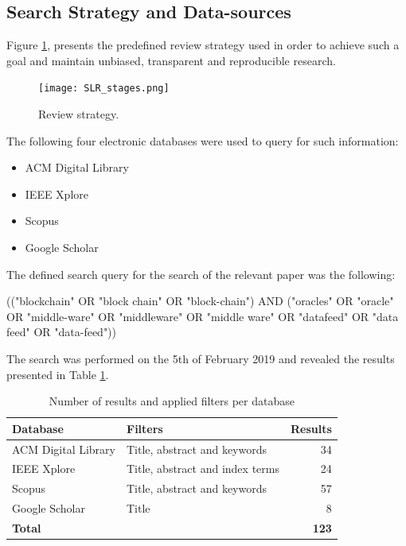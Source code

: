 \subsection{Search Strategy and Data-sources}
Figure \ref{fig:/figures/SLR_stages}, presents the predefined review strategy used in order to achieve such a goal and maintain unbiased, transparent and reproducible research.


\begin{figure}[t]
  \begin{center}
    \leavevmode
    \texttt{[image: SLR\_stages.png]}
    \caption{Review strategy.}
    \label{fig:/figures/SLR_stages}
  \end{center}
\end{figure}

The following four electronic databases were used to query for such information:

\begin{itemize}
\item ACM Digital Library
\item IEEE Xplore
\item Scopus
\item Google Scholar
\end{itemize}


The defined search query for the search of the relevant paper was the following:

(("blockchain" OR "block chain" OR "block-chain") 
AND 
("oracles" OR "oracle" OR "middle-ware" OR "middleware" OR "middle ware" OR "datafeed" OR "data feed" OR "data-feed"))

The search was performed on the 5th of February 2019 and revealed the results presented in Table \ref{search-results-table}.

\begin{table}[H]
\centering
\begin{tabular}{llr}
\hline
\textbf{Database} & \textbf{Filters} & \textbf{Results} \\ \hline
ACM Digital Library & Title, abstract and keywords & 34 \\
IEEE Xplore & Title, abstract and index terms & 24 \\
Scopus & Title, abstract and keywords & 57 \\
Google Scholar & Title & 8 \\ \hline
\textbf{Total} & \textbf{} & \textbf{123} \\ \hline
\end{tabular}
\caption{Number of results and applied filters per database}
\label{search-results-table}
\end{table}

